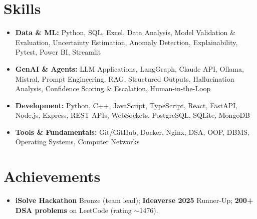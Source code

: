 \documentclass[letterpaper,10pt]{article}
\begin{document}
\section{Skills}
\begin{itemize}
  \small
  \item \textbf{Data \& ML:} Python, SQL, Excel, Data Analysis, Model Validation \& Evaluation, Uncertainty Estimation, Anomaly Detection, Explainability, Pytest, Power BI, Streamlit
  \item \textbf{GenAI \& Agents:} LLM Applications, LangGraph, Claude API, Ollama, Mistral, Prompt Engineering, RAG, Structured Outputs, Hallucination Analysis, Confidence Scoring \& Escalation, Human-in-the-Loop
  \item \textbf{Development:} Python, C++, JavaScript, TypeScript, React, FastAPI, Node.js, Express, REST APIs, WebSockets, PostgreSQL, SQLite, MongoDB
  \item \textbf{Tools \& Fundamentals:} Git/GitHub, Docker, Nginx, DSA, OOP, DBMS, Operating Systems, Computer Networks
\end{itemize}

\section{Achievements}
\begin{itemize}
  \small
  \item \textbf{iSolve Hackathon} Bronze (team lead); \textbf{Ideaverse 2025} Runner-Up; \textbf{200+ DSA problems} on LeetCode (rating $\sim$1476).
\end{itemize}
\end{document}
